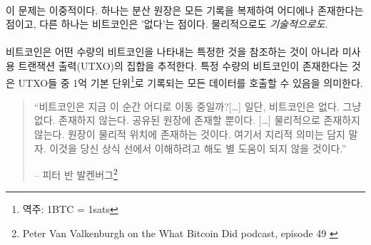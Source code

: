\paragraph{}
이 문제는 이중적이다. 하나는 분산 원장은 모든 기록을 복제하여 어디에나 존재한다는 점이고, 다른 하나는 비트코인은 '없다'는 점이다. 
물리적으로도 \textit{기술적으로도}.

\paragraph{}
비트코인은 어떤 수량의 비트코인을 나타내는 특정한 것을 참조하는 것이 아니라 미사용 트랜잭션 출력(UTXO)의 집합을 추적한다.
특정 수량의 비트코인이 존재한다는 것은 UTXO들 중 1억 기본 단위\footnote{역주: 1BTC = 1sats}로 기록되는 모든 데이터를 호출할 수 있음을 의미한다. 

\begin{quotation}\begin{samepage}
		\enquote{비트코인은 지금 이 순간 어디로 이동 중일까?[\ldots] 일단, 비트코인은
			없다. 그냥 없다. 존재하지 않는다. 공유된 원장에 존재할 뿐이다. [\ldots] 
			물리적으로 존재하지 않는다. 원장이 물리적 위치에 존재하는 것이다.
			여기서 지리적 의미는 담지 말자. 이것을 당신 상식 선에서 이해하려고 해도 별 도움이 되지 않을 것이다.}
		\begin{flushright} -- 피터 반 발켄버그\footnote{Peter Van Valkenburgh on the What Bitcoin Did podcast, episode 49 \cite{wbd049}}
\end{flushright}\end{samepage}\end{quotation}

